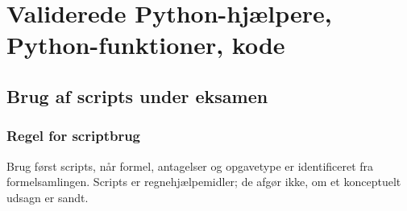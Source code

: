\section{Validerede Python-hjælpere, Python-funktioner, kode}

\subsection{Brug af scripts under eksamen}

\subsubsection{Regel for scriptbrug}
Brug først scripts, når formel, antagelser og opgavetype er identificeret fra formelsamlingen. Scripts er regnehjælpemidler; de afgør ikke, om et konceptuelt udsagn er sandt.

